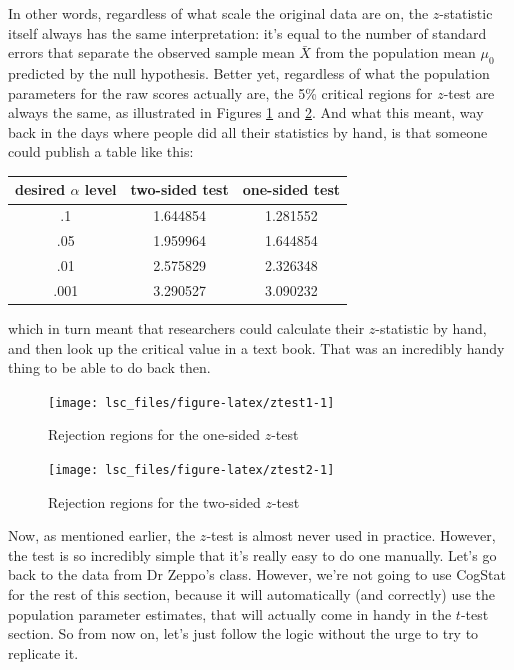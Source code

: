 \documentclass[
]{book}
\theoremstyle{definition}
\theoremstyle{definition}
\theoremstyle{definition}
\theoremstyle{definition}
\theoremstyle{remark}
\begin{document}
In other words, regardless of what scale the original data are on, the \(z\)-statistic itself always has the same interpretation: it's equal to the number of standard errors that separate the observed sample mean \(\bar{X}\) from the population mean \(\mu_0\) predicted by the null hypothesis. Better yet, regardless of what the population parameters for the raw scores actually are, the 5\% critical regions for \(z\)-test are always the same, as illustrated in Figures \ref{fig:ztest1} and \ref{fig:ztest2}. And what this meant, way back in the days where people did all their statistics by hand, is that someone could publish a table like this:

\begin{longtable}[]{@{}ccc@{}}
\toprule()
desired \(\alpha\) level & two-sided test & one-sided test \\
\midrule()
\endhead
.1 & 1.644854 & 1.281552 \\
.05 & 1.959964 & 1.644854 \\
.01 & 2.575829 & 2.326348 \\
.001 & 3.290527 & 3.090232 \\
\bottomrule()
\end{longtable}

which in turn meant that researchers could calculate their \(z\)-statistic by hand, and then look up the critical value in a text book. That was an incredibly handy thing to be able to do back then.

\begin{figure}

{\centering \texttt{[image: lsc\_files/figure-latex/ztest1-1]} 

}

\caption{Rejection regions for the one-sided $z$-test}\label{fig:ztest1}
\end{figure}

\begin{figure}

{\centering \texttt{[image: lsc\_files/figure-latex/ztest2-1]} 

}

\caption{Rejection regions for the two-sided $z$-test}\label{fig:ztest2}
\end{figure}

Now, as mentioned earlier, the \(z\)-test is almost never used in practice. However, the test is so incredibly simple that it's really easy to do one manually. Let's go back to the data from Dr Zeppo's class. However, we're not going to use CogStat for the rest of this section, because it will automatically (and correctly) use the population parameter estimates, that will actually come in handy in the \(t\)-test section. So from now on, let's just follow the logic without the urge to try to replicate it.
\end{document}
